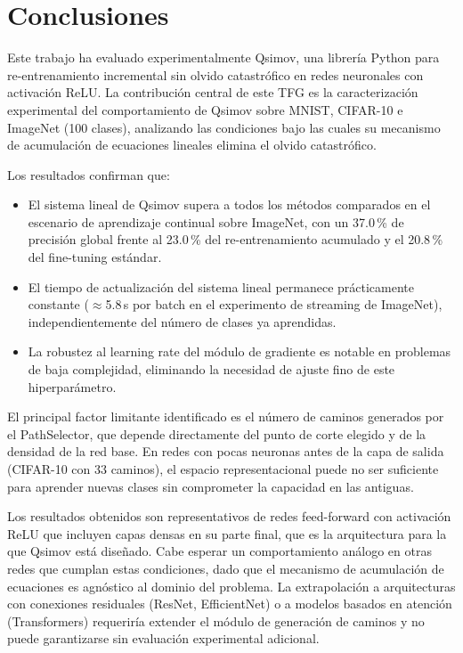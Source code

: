 
\section{Conclusiones}

Este trabajo ha evaluado experimentalmente Qsimov, una librería Python para re-entrenamiento
incremental sin olvido catastrófico en redes neuronales con activación ReLU. La contribución central
de este TFG es la caracterización experimental del comportamiento de Qsimov sobre MNIST, CIFAR-10
e ImageNet (100 clases), analizando las condiciones bajo las cuales su mecanismo de acumulación de
ecuaciones lineales elimina el olvido catastrófico.

Los resultados confirman que:

\begin{itemize}
  \item El sistema lineal de Qsimov supera a todos los métodos comparados en el escenario de
        aprendizaje continual sobre ImageNet, con un 37.0\,\% de precisión global frente al 23.0\,\%
        del re-entrenamiento acumulado y el 20.8\,\% del fine-tuning estándar.
  \item El tiempo de actualización del sistema lineal permanece prácticamente constante
        ($\approx$5.8\,s por batch en el experimento de streaming de ImageNet),
        independientemente del número de clases ya aprendidas.
  \item La robustez al learning rate del módulo de gradiente es notable en problemas de baja
        complejidad, eliminando la necesidad de ajuste fino de este hiperparámetro.
\end{itemize}

El principal factor limitante identificado es el número de caminos generados por el PathSelector,
que depende directamente del punto de corte elegido y de la densidad de la red base. En redes con
pocas neuronas antes de la capa de salida (CIFAR-10 con 33 caminos), el espacio representacional
puede no ser suficiente para aprender nuevas clases sin comprometer la capacidad en las antiguas.

Los resultados obtenidos son representativos de redes feed-forward con activación ReLU que incluyen
capas densas en su parte final, que es la arquitectura para la que Qsimov está diseñado. Cabe
esperar un comportamiento análogo en otras redes que cumplan estas condiciones, dado que el
mecanismo de acumulación de ecuaciones es agnóstico al dominio del problema. La extrapolación a
arquitecturas con conexiones residuales (ResNet, EfficientNet) o a modelos basados en atención
(Transformers) requeriría extender el módulo de generación de caminos y no puede garantizarse sin
evaluación experimental adicional.

